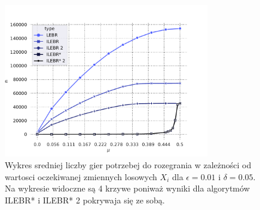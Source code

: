 \documentclass[inzynierska]{pwr_wmat_praca_dyplomowa}
\theoremstyle{plain}
\numberwithin{theorem}{chapter}
\theoremstyle{definition}
\numberwithin{theorem}{chapter}
\begin{document}
	\begin{figure}
		\centering
		\includegraphics[width=0.8\textwidth]{imagens/needed_games_to_play.pdf}
		\caption{Wykres sredniej liczby gier potrzebej do rozegrania w zależności od wartosci oczekiwanej zmiennych losowych  $X_i$ dla $\epsilon=0.01$ i $\delta = 0.05$. Na wykresie widoczne są 4 krzywe poniważ wyniki dla algorytmów ILEBR* i ILEBR* 2 pokrywaja się ze sobą.}
		\label{fig:needed_games_to_play}
	\end{figure}
\end{document}
